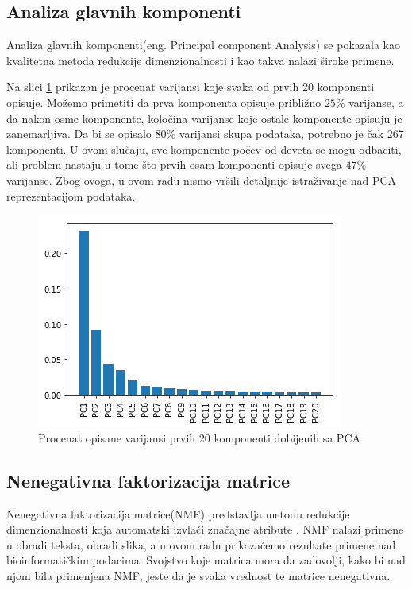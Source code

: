 \documentclass[a4paper]{article}
\begin{document}
\subsection{Analiza glavnih komponenti}
Analiza glavnih komponenti(eng. Principal component Analysis) se pokazala kao kvalitetna metoda redukcije dimenzionalnosti i kao takva nalazi široke primene.

Na slici \ref{pca20} prikazan je procenat varijansi koje svaka od prvih 20 komponenti opisuje. Možemo primetiti da prva komponenta opisuje približno $25\%$ varijanse, a da nakon osme komponente, koločina varijanse koje ostale komponente opisuju je zanemarljiva. Da bi se opisalo $80\%$ varijansi skupa podataka, potrebno je čak $267$ komponenti. U ovom slučaju, sve komponente počev od deveta se mogu odbaciti, ali problem nastaju u tome što prvih osam komponenti opisuje svega $47\%$ varijanse. Zbog ovoga, u ovom radu nismo vršili detaljnije istraživanje nad PCA reprezentacijom podataka.


\begin{figure}[H]
\centering
\includegraphics[scale=0.7]{pca20}
\caption{Procenat opisane varijansi prvih 20 komponenti dobijenih sa PCA}
\label{pca20}
\end{figure}



\subsection{Nenegativna faktorizacija matrice}
Nenegativna faktorizacija matrice(NMF) predstavlja metodu redukcije dimenzionalnosti koja automatski izvlači značajne atribute \cite{gillis2014and}. NMF nalazi primene u obradi teksta, obradi slika, a u ovom radu prikazaćemo rezultate primene nad bioinformatičkim podacima. Svojstvo koje matrica mora da zadovolji, kako bi nad njom bila primenjena NMF, jeste da je svaka vrednost te matrice nenegativna.
\end{document}
